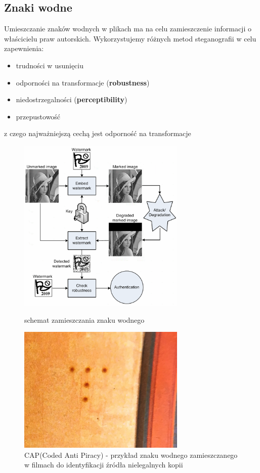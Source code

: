 \documentclass{article}
\begin{document}
\subsection{Znaki wodne}
Umieszczanie znaków wodnych w plikach ma na celu zamieszczenie informacji o właścicielu praw autorskich.
Wykorzystujemy różnych metod steganografii w celu zapewnienia:
\begin{itemize}
	\item trudności w usunięciu
	\item odporności na transformacje (\textbf{robustness})
	\item niedostrzegalności (\textbf{perceptibility})
	\item przepustowość
\end{itemize} 
z czego najważniejszą cechą jest odporność na transformacje
\begin{figure}[H]
	\centering
	\includegraphics[width=8cm]{watermark}
	\caption{schemat zamieszczania znaku wodnego}
	\includegraphics[width=8cm]{cap}
	\caption{CAP(Coded Anti Piracy) - przykład znaku wodnego zamieszczanego w filmach do identyfikacji źródła nielegalnych kopii}
\end{figure}
\end{document}
